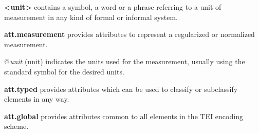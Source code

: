 \begin{sansreflist}
  
\item [\textbf{<unit>}] contains a symbol, a word or a phrase referring to a unit of measurement in any kind of formal or informal system.
\item [\textbf{att.measurement}] provides attributes to represent a regularized or normalized measurement.\hfil\\[-10pt]\begin{sansreflist}
    \item[@{\itshape unit}]
  (unit) indicates the units used for the measurement, usually using the standard symbol for the desired units.
\end{sansreflist}  
\item [\textbf{att.typed}] provides attributes which can be used to classify or subclassify elements in any way.
\item [\textbf{att.global}] provides attributes common to all elements in the TEI encoding scheme.
\end{sansreflist}
